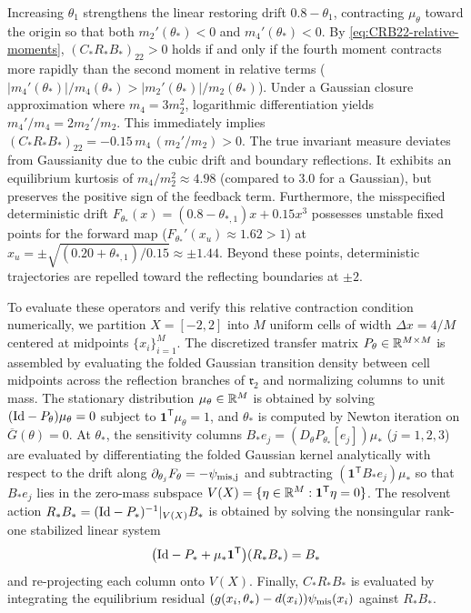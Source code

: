Increasing $\theta_1$ strengthens the linear restoring drift $0.8-\theta_1$, contracting $\mu_\theta$ toward the origin so that both $m_2'(\theta_*) < 0$ and $m_4'(\theta_*) < 0$. By \eqref{eq:CRB22-relative-moments}, $(C_*R_*B_*)_{22} > 0$ holds if and only if the fourth moment contracts more rapidly than the second moment in relative terms ($\lvert m_4'(\theta_*)\rvert/m_4(\theta_*) > \lvert m_2'(\theta_*)\rvert/m_2(\theta_*)$). Under a Gaussian closure approximation where $m_4 = 3 m_2^2$, logarithmic differentiation yields $m_4'/m_4 = 2 m_2'/m_2$. This immediately implies $(C_*R_*B_*)_{22} = -0.15\,m_4\,(m_2'/m_2) > 0$. The true invariant measure deviates from Gaussianity due to the cubic drift and boundary reflections. It exhibits an equilibrium kurtosis of $m_4/m_2^2 \approx 4.98$ (compared to $3.0$ for a Gaussian), but preserves the positive sign of the feedback term. Furthermore, the misspecified deterministic drift $F_{\theta_*}(x) = (0.8 - \theta_{*,1})x + 0.15 x^3$ possesses unstable fixed points for the forward map ($F_{\theta_*}'(x_u) \approx 1.62 > 1$) at $x_u = \pm\sqrt{(0.20 + \theta_{*,1})/0.15} \approx \pm 1.44$. Beyond these points, deterministic trajectories are repelled toward the reflecting boundaries at $\pm 2$.

To evaluate these operators and verify this relative contraction condition numerically, we partition $X=[-2,2]$ into $M$ uniform cells of width $\Delta x = 4/M$ centered at midpoints $\{x_i\}_{i=1}^M$. The discretized transfer matrix $P_\theta \in \mathbb{R}^{M\times M}$ is assembled by evaluating the folded Gaussian transition density between cell midpoints across the reflection branches of $\mathfrak{r}_2$ and normalizing columns to unit mass. The stationary distribution $\mu_\theta \in \mathbb{R}^M$ is obtained by solving $(\mathrm{Id} - P_\theta)\mu_\theta = 0$ subject to $\mathbf{1}^{\mathsf T}\mu_\theta = 1$, and $\theta_*$ is computed by Newton iteration on $\overline G(\theta)=0$. At $\theta_*$, the sensitivity columns $B_* e_j = (D_\theta P_{\theta_*}[e_j])\mu_*$ ($j=1,2,3$) are evaluated by differentiating the folded Gaussian kernel analytically with respect to the drift along $\partial_{\theta_j} F_\theta = -\psi_{\rm mis,j}$ and subtracting $(\mathbf{1}^{\mathsf T} B_* e_j)\mu_*$ so that $B_* e_j$ lies in the zero-mass subspace $V(X) = \{\eta \in \mathbb{R}^M : \mathbf{1}^{\mathsf T}\eta = 0\}$. The resolvent action $R_* B_* = (\mathrm{Id} - P_*)^{-1}\vert_{V(X)} B_*$ is obtained by solving the nonsingular rank-one stabilized linear system
\[
    \bigl(\mathrm{Id} - P_* + \mu_* \mathbf{1}^{\mathsf T}\bigr)(R_* B_*) = B_*
\]
and re-projecting each column onto $V(X)$. Finally, $C_* R_* B_*$ is evaluated by integrating the equilibrium residual $(g(x_i,\theta_*) - d(x_i))\psi_{\rm mis}(x_i)$ against $R_* B_*$.

